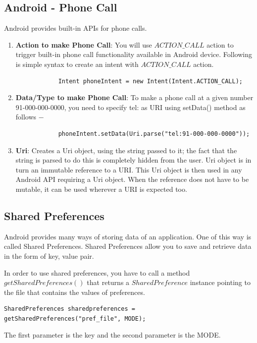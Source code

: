 \documentclass{article}
\begin{document}
\subsection{Android - Phone Call}
	Android provides built-in APIs for phone calls.
    \begin{enumerate}
    \item \textbf{Action to make Phone Call}:
     You will use $ACTION\_CALL$ action to trigger built-in phone call functionality available in Android device. Following is simple syntax to create an intent with $ACTION\_CALL$ action.
     	\begin{lstlisting}
     		Intent phoneIntent = new Intent(Intent.ACTION_CALL);
     	\end{lstlisting}
     \item \textbf{ Data/Type to make Phone Call}:
     To make a phone call at a given number 91-000-000-0000, you need to specify tel: as URI using setData() method as follows −
     
     	\begin{lstlisting}
     		phoneIntent.setData(Uri.parse("tel:91-000-000-0000"));
     	\end{lstlisting}
        
    \item \textbf{Uri}:
    Creates a Uri object, using the string passed to it; the fact that the string is parsed to do this is completely hidden from the user.
     Uri object is in turn an immutable reference to a URI. This Uri object is then used in any Android API requiring a Uri object. When the reference does not have to be mutable, it can be used wherever a URI is expected too.
	\end{enumerate}
    
\subsection{Shared Preferences}     
Android provides many ways of storing data of an application. One of this way is called Shared Preferences. Shared Preferences allow you to save and retrieve data in the form of key, value pair.

In order to use shared preferences, you have to call a method $getSharedPreferences()$ that returns a $SharedPreference$ instance pointing to the file that contains the values of preferences.\\
	\begin{lstlisting}
SharedPreferences sharedpreferences = getSharedPreferences("pref_file", MODE);	
	\end{lstlisting}
The first parameter is the key and the second parameter is the MODE.
 	
\end{document}
